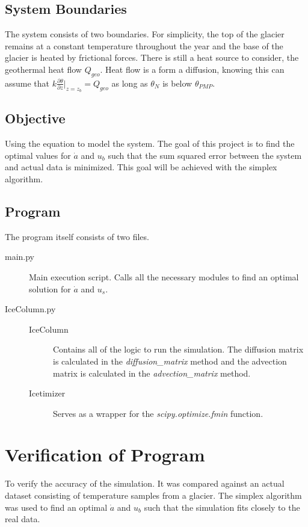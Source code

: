\documentclass{article}%
\begin{document}
    \subsection{System Boundaries}
    The system consists of two boundaries. 
    For simplicity, the top of the glacier remains at a constant temperature throughout the year and the base of the glacier is heated by frictional forces. 
    There is still a heat source to consider, the geothermal heat flow $Q_{geo}$. 
    Heat flow is a form a diffusion, knowing this can assume that $k \frac{\partial \theta}{\partial z} |_{z=z_b}= Q_{geo}$ as long as $\theta_N$ is below $\theta_{PMP}$.

    \subsection{Objective}
    Using the equation to model the system. 
    The goal of this project is to find the optimal values for $\dot{a}$ and $u_b$ such that the sum squared error between the system and actual data is minimized. This goal will be achieved with the simplex algorithm. 

    \subsection{Program}
    The program itself consists of two files.
    \begin{description}
        \item[main.py] Main execution script. Calls all the necessary modules to find an optimal solution for $\dot{a}$ and $u_s$.
        \item[IceColumn.py] 
        \begin{description}
            \item[IceColumn] Contains all of the logic to run the simulation. The diffusion matrix is calculated in the {\it diffusion\_matrix } method and the advection matrix is calculated in the {\it advection\_matrix} method. 
            \item[Icetimizer] Serves as a wrapper for the {\it scipy.optimize.fmin } function. 
        \end{description}
    \end{description}

    \section{Verification of Program}
    To verify the accuracy of the simulation. It was compared against an actual dataset consisting of temperature samples from a glacier. The simplex algorithm was used to find an optimal $\dot{a}$ and $u_b$ such that the simulation fits closely to the real data. 
\end{document}
